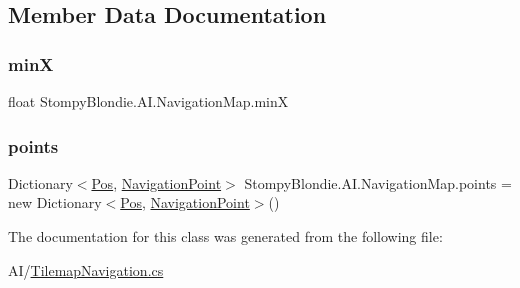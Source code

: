 \subsection{Member Data Documentation}
\mbox{\label{class_stompy_blondie_1_1_a_i_1_1_navigation_map_a2db7ec95521970ba1e2eafbeaf3418fc}} 
\subsubsection{\texorpdfstring{minX}{minX}}
{\footnotesize\ttfamily float Stompy\+Blondie.\+A\+I.\+Navigation\+Map.\+minX}

\mbox{\label{class_stompy_blondie_1_1_a_i_1_1_navigation_map_af4f71225b8d491f23974e2b4cf2d18e9}} 
\subsubsection{\texorpdfstring{points}{points}}
{\footnotesize\ttfamily Dictionary$<$\mbox{\hyperlink{struct_stompy_blondie_1_1_common_1_1_types_1_1_pos}{Pos}}, \mbox{\hyperlink{struct_stompy_blondie_1_1_a_i_1_1_navigation_point}{Navigation\+Point}}$>$ Stompy\+Blondie.\+A\+I.\+Navigation\+Map.\+points = new Dictionary$<$\mbox{\hyperlink{struct_stompy_blondie_1_1_common_1_1_types_1_1_pos}{Pos}}, \mbox{\hyperlink{struct_stompy_blondie_1_1_a_i_1_1_navigation_point}{Navigation\+Point}}$>$()}



The documentation for this class was generated from the following file\+:\begin{DoxyCompactItemize}
\item 
A\+I/\mbox{\hyperlink{_tilemap_navigation_8cs}{Tilemap\+Navigation.\+cs}}\end{DoxyCompactItemize}

